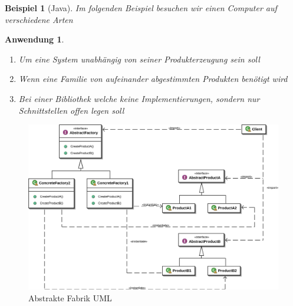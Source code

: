 \documentclass[a4paper]{article}
\theoremstyle{break}
\newtheorem{ex}{Beispiel}[section]
\newtheorem{why}{Anwendung}[section]
\begin{document}
\begin{ex}[Java]
	Im folgenden Beispiel besuchen wir einen Computer auf verschiedene Arten
	
	
	
	
	
	
	
	
	
	
	
	
\end{ex}

\begin{why}
	\begin{enumerate}
		\item Um eine System unabhängig von seiner Produkterzeugung sein soll
		\item Wenn eine Familie von aufeinander abgestimmten Produkten benötigt wird
		\item Bei einer Bibliothek welche keine Implementierungen, sondern nur Schnittstellen offen legen soll
	\end{enumerate}
	
	
\end{why}
\begin{figure}[H]
	\centering
	\includegraphics[width=\textwidth]{../diagrams/uml/AbstractFactoryPattern.png}
	\caption{Abstrakte Fabrik UML}
\end{figure}
\end{document}
